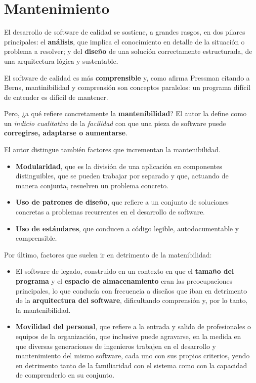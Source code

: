 \section{Mantenimiento}

El desarrollo de software de calidad se sostiene,
a grandes rasgos, en dos pilares principales:
el \textbf{análisis}, que implica el conocimiento en detalle de la situación 
o problema a resolver; y del \textbf{diseño} de una solución correctamente 
estructurada, de una arquitectura lógica y sustentable.

El software de calidad es más \textbf{comprensible} y, 
como afirma Pressman citando a Berns, 
mantinibilidad y comprensión son conceptos paralelos:
un programa difícil de entender es difícil de mantener.

Pero, ¿a qué refiere concretamente la \textbf{mantenibilidad}?
El autor la define como un \textit{indicio cualitativo}
de la \textit{facilidad} con que una pieza de software puede
\textbf{corregirse, adaptarse o aumentarse}.

El autor distingue también factores que incrementan la mantenibilidad.
\begin{itemize}
    \item \textbf{Modularidad},
    que es la división de una aplicación en componentes distinguibles,
    que se pueden trabajar por separado y que, 
    actuando de manera conjunta, 
    resuelven un problema concreto.
    \item \textbf{Uso de patrones de diseño},
    que refiere a un conjunto de soluciones concretas a problemas recurrentes
    en el desarrollo de software.
    \item \textbf{Uso de estándares},
    que conducen a código legible, autodocumentable y comprensible.
\end{itemize}

Por último, factores que suelen ir en detrimento de la matenibilidad:

\begin{itemize}
    \item El software de legado, construido en un contexto en que 
    el \textbf{tamaño del programa} y el \textbf{espacio de almacenamiento}
    eran las preocupaciones principales, lo que conducía con frecuencia a 
    diseños que iban en detrimento de la \textbf{arquitectura del software},
    dificultando comprensión y, por lo tanto, la mantenibilidad.
    \item \textbf{Movilidad del personal},
    que refiere a la entrada y salida de profesionales o equipos de la 
    organización, que inclusive puede agravarse,
    en la medida en que diversas generaciones de ingenieros trabajen en el 
    desarrollo y mantenimiento del mismo software,
    cada uno con sus propios criterios,
    yendo en detrimento tanto de la familiaridad con el sistema como con 
    la capacidad de comprenderlo en su conjunto.
\end{itemize}